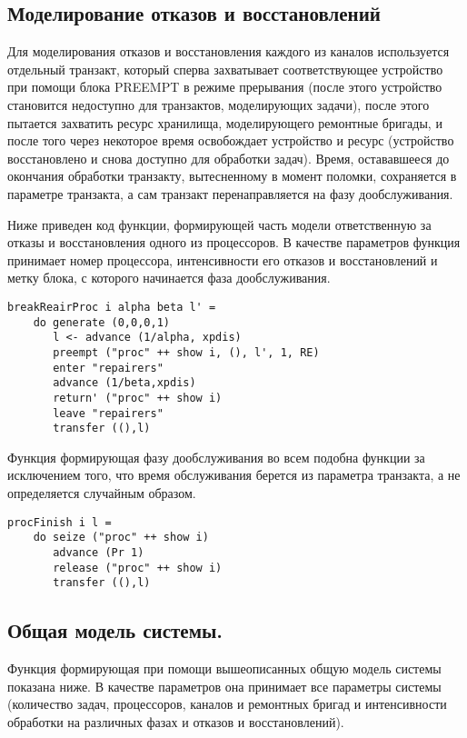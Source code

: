 \subsection{Моделирование отказов и восстановлений}

Для моделирования отказов и восстановления каждого из каналов используется отдельный транзакт, который сперва захватывает соответствующее устройство при помощи блока PREEMPT в режиме прерывания (после этого устройство становится недоступно для транзактов, моделирующих задачи), после этого пытается захватить ресурс хранилища, моделирующего ремонтные бригады, и после того через некоторое время освобождает устройство и ресурс (устройство восстановлено и снова доступно для обработки задач). Время, остававшееся до окончания обработки транзакту, вытесненному в момент поломки, сохраняется в  параметре транзакта, а сам транзакт перенаправляется на фазу дообслуживания.


Ниже приведен код функции, формирующей часть модели ответственную за отказы и восстановления одного из процессоров. В качестве параметров функция принимает номер процессора, интенсивности его отказов и восстановлений и метку блока, с которого начинается фаза дообслуживания.

\begin{verbatim}
breakReairProc i alpha beta l' = 
    do generate (0,0,0,1)
       l <- advance (1/alpha, xpdis)
       preempt ("proc" ++ show i, (), l', 1, RE)
       enter "repairers"
       advance (1/beta,xpdis)
       return' ("proc" ++ show i)
       leave "repairers"
       transfer ((),l)
\end{verbatim}

Функция формирующая фазу дообслуживания во всем подобна функции  за исключением того, что время обслуживания берется из параметра транзакта, а не определяется случайным образом.

\begin{verbatim}
procFinish i l =
    do seize ("proc" ++ show i)
       advance (Pr 1)
       release ("proc" ++ show i)
       transfer ((),l)
\end{verbatim}

\subsection {Общая модель системы.}

Функция формирующая при помощи вышеописанных общую модель системы показана ниже. В качестве параметров она принимает все параметры системы (количество задач, процессоров, каналов и ремонтных бригад и интенсивности обработки на различных фазах и отказов и восстановлений).

